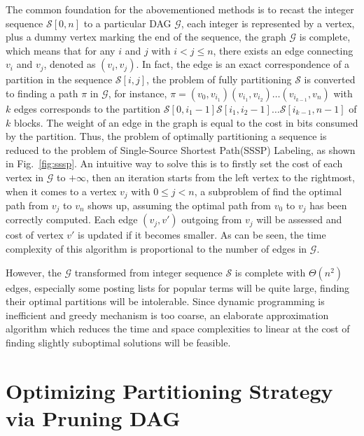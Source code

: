 \documentclass[runningheads,a4paper]{llncs}
\begin{document}
The common foundation for the abovementioned methods is to recast the integer sequence $\mathcal{S} \left[ 0,n \right]$ to a particular DAG $\mathcal{G}$, each integer is represented by a vertex, plus a dummy vertex marking the end of the sequence, the graph $\mathcal{G}$ is complete, which means that for any $i$ and $j$ with $i < j \leqslant n$, there exists an edge connecting $v_{i}$ and $v_{j}$, denoted as $\left( v_{i}, v_{j} \right)$. In fact, the edge is an exact correspondence of a partition in the sequence $\mathcal{S}\left[i,j \right] $, the problem of fully partitioning $\mathcal{S}$ is converted to finding a path $\pi$ in $\mathcal{G}$, for instance, $\pi=\left( v_{0}, v_{i_{1}} \right) \left( v_{i_{1}}, v_{i_{2}} \right)\ldots\left( v_{i_{k-1}}, v_{n} \right)$ with $k$ edges corresponds to the partition $\mathcal{S}\left[0,i_{1}-1 \right]\mathcal{S}\left[i_{1},i_{2}-1 \right] \ldots\mathcal{S}\left[i_{k-1},n-1\right] $ of $k$ blocks. The weight of an edge in the graph is equal to the cost in bits consumed by the partition. Thus, the problem of optimally partitioning a sequence is reduced to the problem of Single-Source Shortest Path(SSSP) Labeling, as shown in Fig.~\ref{fig:sssp}. An intuitive way to solve this is to firstly set the cost of each vertex in $\mathcal{G}$ to $+\infty$, then an iteration starts from the left vertex to the rightmost, when it comes to a vertex $v_{j}$ with $0\leqslant j < n$, a subproblem of find the optimal path from $v_{j}$ to $v_{n}$ shows up, assuming the optimal path from $v_{0}$ to $v_{j}$ has been correctly computed. Each edge $\left( v_{j},v'\right)$ outgoing from $v_{j}$ will be assessed and cost of vertex $v'$ is updated if it becomes smaller. As can be seen, the time complexity of this algorithm is proportional to the number of edges in $\mathcal{G}$.

However, the $\mathcal{G}$ transformed from integer sequence $\mathcal{S}$ is complete with $\Theta\left( n^{2}\right)$ edges, especially some posting lists for popular terms will be quite large, finding their optimal partitions will be intolerable. Since dynamic programming is inefficient and greedy mechanism is too coarse, an elaborate approximation algorithm which reduces the time and space complexities to linear at the cost of finding slightly suboptimal solutions will be feasible.

\section{Optimizing Partitioning Strategy via Pruning DAG}\label{sec:optimization}
\end{document}
